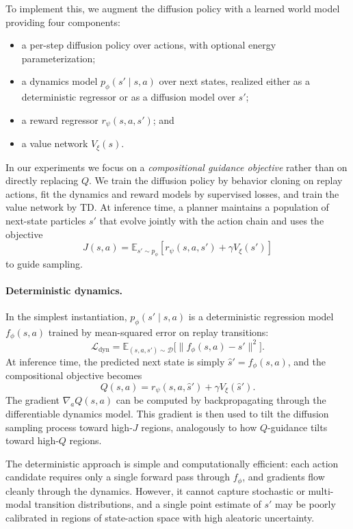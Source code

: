 \documentclass{article}
\theoremstyle{plain}
\theoremstyle{definition}
\theoremstyle{remark}
\newcommand{\E}{\mathbb{E}}
\begin{document}
To implement this, we augment the diffusion policy with a learned world model providing four components:
\begin{itemize}
  \item a per-step diffusion policy over actions, with optional energy parameterization;
  \item a dynamics model $p_\phi(s'\mid s,a)$ over next states, realized either as a deterministic regressor or as a diffusion model over $s'$;
  \item a reward regressor $r_\psi(s,a,s')$; and
  \item a value network $V_\xi(s)$.
\end{itemize}

In our experiments we focus on a \emph{compositional guidance objective} rather than on directly replacing $Q$.
We train the diffusion policy by behavior cloning on replay actions, fit the dynamics and reward models by supervised losses, and train the value network by TD.
At inference time, a planner maintains a population of next-state particles $s'$ that evolve jointly with the action chain and uses the objective
\begin{equation}
  J(s,a) = \E_{s'\sim p_\phi}[r_\psi(s,a,s') + \gamma V_\xi(s')]
  \label{eq:J-def}
\end{equation}
to guide sampling.

\paragraph{Deterministic dynamics.}
In the simplest instantiation, $p_\phi(s'\mid s,a)$ is a deterministic regression model $f_\phi(s,a)$ trained by mean-squared error on replay transitions:
\begin{equation}
  \mathcal{L}_{\text{dyn}} = \E_{(s,a,s')\sim\mathcal{D}}\bigl[\|f_\phi(s,a) - s'\|^2\bigr].
\end{equation}
At inference time, the predicted next state is simply $\hat{s}' = f_\phi(s,a)$, and the compositional objective becomes
\begin{equation}
  Q(s,a) = r_\psi(s,a,\hat{s}') + \gamma V_\xi(\hat{s}').
\end{equation}
The gradient $\nabla_a Q(s,a)$ can be computed by backpropagating through the differentiable dynamics model.
This gradient is then used to tilt the diffusion sampling process toward high-$J$ regions, analogously to how $Q$-guidance tilts toward high-$Q$ regions.

The deterministic approach is simple and computationally efficient: each action candidate requires only a single forward pass through $f_\phi$, and gradients flow cleanly through the dynamics.
However, it cannot capture stochastic or multi-modal transition distributions, and a single point estimate of $s'$ may be poorly calibrated in regions of state-action space with high aleatoric uncertainty.
\end{document}

